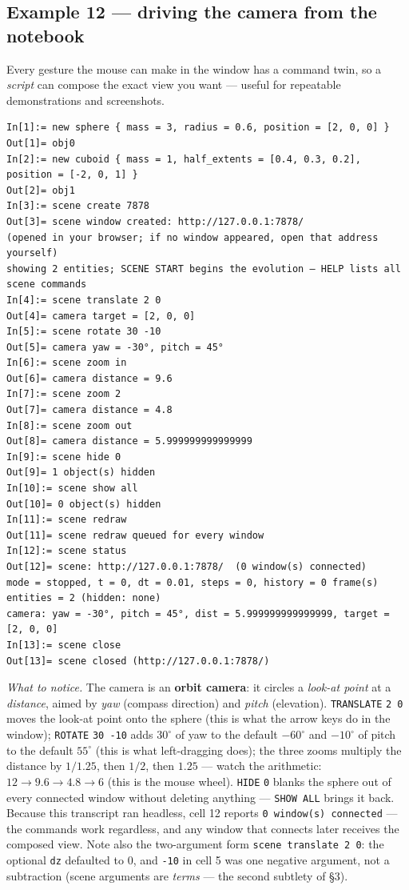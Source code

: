 \documentclass[11pt]{article}
\newcommand{\kw}[1]{\texttt{\uppercase{#1}}}
\newcommand{\code}[1]{\texttt{#1}}
\begin{document}
\subsection{Example 12 --- driving the camera from the notebook}

Every gesture the mouse can make in the window has a command twin, so
a \emph{script} can compose the exact view you want --- useful for
repeatable demonstrations and screenshots.

\begin{lstlisting}
In[1]:= new sphere { mass = 3, radius = 0.6, position = [2, 0, 0] }
Out[1]= obj0
In[2]:= new cuboid { mass = 1, half_extents = [0.4, 0.3, 0.2], position = [-2, 0, 1] }
Out[2]= obj1
In[3]:= scene create 7878
Out[3]= scene window created: http://127.0.0.1:7878/
(opened in your browser; if no window appeared, open that address yourself)
showing 2 entities; SCENE START begins the evolution — HELP lists all scene commands
In[4]:= scene translate 2 0
Out[4]= camera target = [2, 0, 0]
In[5]:= scene rotate 30 -10
Out[5]= camera yaw = -30°, pitch = 45°
In[6]:= scene zoom in
Out[6]= camera distance = 9.6
In[7]:= scene zoom 2
Out[7]= camera distance = 4.8
In[8]:= scene zoom out
Out[8]= camera distance = 5.999999999999999
In[9]:= scene hide 0
Out[9]= 1 object(s) hidden
In[10]:= scene show all
Out[10]= 0 object(s) hidden
In[11]:= scene redraw
Out[11]= scene redraw queued for every window
In[12]:= scene status
Out[12]= scene: http://127.0.0.1:7878/  (0 window(s) connected)
mode = stopped, t = 0, dt = 0.01, steps = 0, history = 0 frame(s)
entities = 2 (hidden: none)
camera: yaw = -30°, pitch = 45°, dist = 5.999999999999999, target = [2, 0, 0]
In[13]:= scene close
Out[13]= scene closed (http://127.0.0.1:7878/)
\end{lstlisting}

\emph{What to notice.} The camera is an \textbf{orbit camera}: it
circles a \emph{look-at point} at a \emph{distance}, aimed by
\emph{yaw} (compass direction) and \emph{pitch} (elevation).
\kw{translate} \code{2 0} moves the look-at point onto the sphere
(this is what the arrow keys do in the window); \kw{rotate}
\code{30 -10} adds $30^\circ$ of yaw to the default $-60^\circ$ and
$-10^\circ$ of pitch to the default $55^\circ$ (this is what
left-dragging does); the three zooms multiply the distance by
$1/1.25$, then $1/2$, then $1.25$ --- watch the arithmetic:
$12 \to 9.6 \to 4.8 \to 6$ (this is the mouse wheel). \kw{hide}
\code{0} blanks the sphere out of every connected window without
deleting anything --- \kw{show all} brings it back. Because this
transcript ran headless, cell 12 reports \code{0 window(s) connected}
--- the commands work regardless, and any window that connects later
receives the composed view. Note also the two-argument form
\code{scene translate 2 0}: the optional \code{dz} defaulted to 0, and
\code{-10} in cell 5 was one negative argument, not a subtraction
(scene arguments are \emph{terms} --- the second subtlety of \S3).
\end{document}
